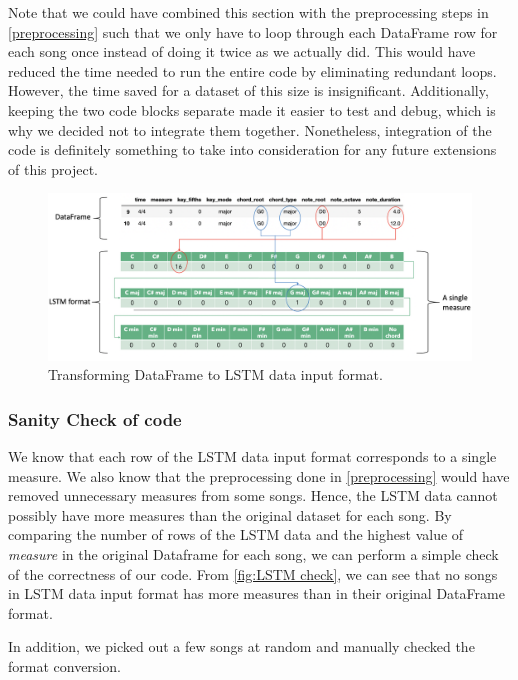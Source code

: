 Note that we could have combined this section with the preprocessing steps in \cref{preprocessing} such that we only have to loop through each DataFrame row for each song once instead of doing it twice as we actually did. This would have reduced the time needed to run the entire code by eliminating redundant loops. However, the time saved for a dataset of this size is insignificant. Additionally, keeping the two code blocks separate made it easier to test and debug, which is why we decided not to integrate them together. Nonetheless, integration of the code is definitely something to take into consideration for any future extensions of this project.
\begin{figure}
    \centering
    \includegraphics[scale=0.3]{Figures/LSTM pictorial 4}
    \decoRule
    \caption{Transforming DataFrame to LSTM data input format.}
    \label{fig:LSTM training}
    \end{figure}
    
\subsubsection{Sanity Check of code}
\label{lstm check}
We know that each row of the LSTM data input format corresponds to a single measure. We also know that the preprocessing done in \cref{preprocessing} would have removed unnecessary measures from some songs. Hence, the LSTM data cannot possibly have more measures than the original dataset for each song. By comparing the number of rows of the LSTM data and the highest value of \emph{measure} in the original Dataframe for each song, we can perform a simple check of the correctness of our code. From \cref{fig:LSTM check}, we can see that no songs in LSTM data input format has more measures than in their original DataFrame format.

In addition, we picked out a few songs at random and manually checked the format conversion.

